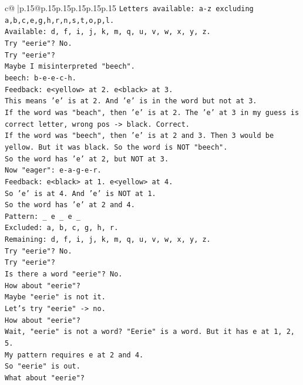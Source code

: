 \documentclass{article}
\begin{document}
{\begin{supertabular}{c@{$\;$}|p{.15\linewidth}@{}p{.15\linewidth}p{.15\linewidth}p{.15\linewidth}p{.15\linewidth}p{.15\linewidth}}
{{{\texttt{Letters available: a{-}z excluding a,b,c,e,g,h,r,n,s,t,o,p,l.} \\
\texttt{Available: d, f, i, j, k, m, q, u, v, w, x, y, z.} \\
\texttt{Try "eerie"? No.} \\
\texttt{Try "eerie"?} \\
\texttt{Maybe I misinterpreted "beech".} \\
\texttt{beech: b{-}e{-}e{-}c{-}h.} \\
\texttt{Feedback: e<yellow> at 2. e<black> at 3.} \\
\texttt{This means 'e' is at 2. And 'e' is in the word but not at 3.} \\
\texttt{If the word was "beach", then 'e' is at 2. The 'e' at 3 in my guess is correct letter, wrong pos {-}> black. Correct.} \\
\texttt{If the word was "beech", then 'e' is at 2 and 3. Then 3 would be yellow. But it was black. So the word is NOT "beech".} \\
\texttt{So the word has 'e' at 2, but NOT at 3.} \\
\texttt{Now "eager": e{-}a{-}g{-}e{-}r.} \\
\texttt{Feedback: e<black> at 1. e<yellow> at 4.} \\
\texttt{So 'e' is at 4. And 'e' is NOT at 1.} \\
\texttt{So the word has 'e' at 2 and 4.} \\
\texttt{Pattern: \_ e \_ e \_} \\
\texttt{Excluded: a, b, c, g, h, r.} \\
\texttt{Remaining: d, f, i, j, k, m, q, u, v, w, x, y, z.} \\
\texttt{Try "eerie"? No.} \\
\texttt{Try "eerie"?} \\
\texttt{Is there a word "eerie"? No.} \\
\texttt{How about "eerie"?} \\
\texttt{Maybe "eerie" is not it.} \\
\texttt{Let's try "eerie" {-}> no.} \\
\texttt{How about "eerie"?} \\
\texttt{Wait, "eerie" is not a word? "Eerie" is a word. But it has e at 1, 2, 5.} \\
\texttt{My pattern requires e at 2 and 4.} \\
\texttt{So "eerie" is out.} \\
\texttt{What about "eerie"?} \\
}}}
\end{supertabular}}
\end{document}
